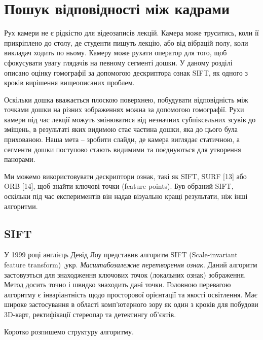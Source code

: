 \section{Пошук відповідності між кадрами}

Рух камери не є рідкістю для відеозаписів лекцій. Камера може труситись,
коли її прикріплено до столу, де студенти пишуть лекцію, або від
вібрацій полу, коли викладач ходить по ньому. Камеру може рухати
оператор для того, щоб сфокусувати увагу глядачів на певному сегменті
дошки. У даному розділі описано оцінку гомографії за допомогою
дескриптора ознак SIFT, як одного з кроків вирішення вищеописаних
проблем.

Оскільки дошка вважається плоскою поверхнею, побудувати відповідність
між точками дошки на різних зображеннях можна за допомогою гомографії.
Рухи камери під час лекції можуть змінюватися від незначних
субпіксельних зсувів до зміщень, в результаті яких видимою стає частина
дошки, яка до цього була прихованою. Наша мета -- зробити слайди, де
камера виглядає статичною, а сегменти дошки поступово стають видимими та
поєднуються для утворення панорами.

Ми можемо використовувати дескриптори ознак, такі як SIFT, SURF [13] або ORB
    [14], щоб знайти ключові точки (feature points). Був обраний SIFT, оскільки під час
експериментів він надав візуально кращі результати, ніж інші алгоритми.


\subsection{SIFT}

У 1999 році англієць Девід Лоу представив алгоритм SIFT (Scale-invariant feature transform)
,укр. \textit{Масштабозалежне перетворення ознак}. Даний алгоритм
застовуэться для знаходження ключових точок (локальних ознак) зображення. Метод досить точно
і швидко знаходить дані точки.
Головною перевагою алгоритму є інваріантність щодо просторової орієнтації та якості освітлення.
Має широке застосування в області комп'ютерного зору як один з кроків для побудови 3D-карт,
ректифікації стереопар та детектингу об'єктів.

Коротко розпишемо структуру алгоритму.

